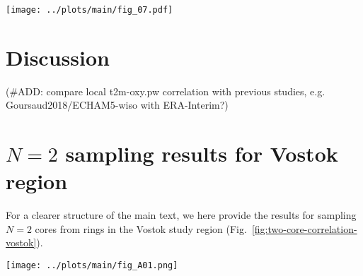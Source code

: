 \documentclass[cp, manuscript]{copernicus}
\begin{document}
\begin{figure*}[t]%
\centering
\texttt{[image: ../plots/main/fig\_07.pdf]}
\caption{%
  Correlation increase and risk of adverse sampling. (\textbf{a}) The increase
  in expected correlation with the target temperature at the EDML (red) and
  Vostok (blue) sites depending on the number of sites for averaging
  $\delta^{18}\mathrm{O}^{\mathrm{(pw)}}$ time series. Sampling is performed
  either from the innermost ring only (dashed lines), or from all possible
  individual combinations of sites for the respective optimal ring combination
  determined for each number of sites (solid lines). (\textbf{b}) Histogram of
  all possible individual correlations for sampling from the optimal ring
  combination for averaging $N=2$ sites compared to the correlation (vertical
  lines) for sampling from the innermost ring only, displayed for the EDML (red)
  and Vostok (blue) target sites.}
\label{fig:cor.increase.risk}%
\end{figure*}%

\section{Discussion}\label{discussion}

(\#ADD: compare local t2m-oxy.pw correlation with previous studies,
e.g. Goursaud2018/ECHAM5-wiso with ERA-Interim?)


\appendix

\section{$N=2$ sampling results for Vostok region}
\label{app:vostok.n2}

For a clearer structure of the main text, we here provide the results for
sampling $N=2$ cores from rings in the Vostok study region
(Fig.~\ref{fig:two-core-correlation-vostok}).

\begin{figure*}[t]%
\centering
\texttt{[image: ../plots/main/fig\_A01.png]}
\caption{%
  The expected correlation with the target site temperature for the average of
  two cores in the Vostok region. Shown is the mean correlation of all possible
  single correlations from averaging two grid cells of (\textbf{a})
  $T_{\mathrm{2m}}$, (\textbf{b}) $T_{\mathrm{2m}}^{\mathrm{(pw)}}$ and
  (\textbf{c}) $\delta^{18}\mathrm{O}^{\mathrm{(pw)}}$ time series sampled from
  the same or from two different rings, averaged over all target sites in
  the given region. The axes display the distance from the target, where the $x$
  ($y$) axis stands for the first (second) sampled ring and tickmarks
  indicate the radius of the midpoints of the rings. Note that for
  $\delta^{18}\mathrm{O}^{\mathrm{(pw)}}$ the correlation maximum is, albeit
  marginal, located for combining the innermost ring with the ring between
  $500$--$750$\,km.}
\label{fig:two-core-correlation-vostok}%
\end{figure*}%
\end{document}
